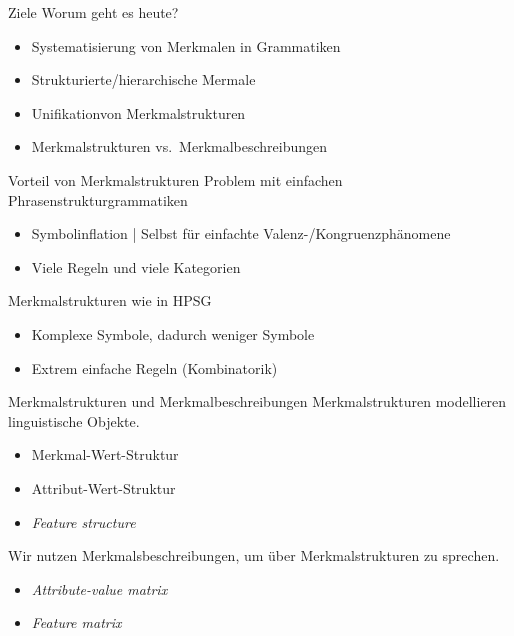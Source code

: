 
\begin{frame}
  {Ziele}
  \onslide<+->
  \onslide<+->
  Worum geht es heute?\\
  \Zeile
  \begin{itemize}[<+->]
    \item Systematisierung von Merkmalen in Grammatiken
    \item Strukturierte\slash hierarchische Mermale
    \item Unifikationvon Merkmalstrukturen
    \item Merkmalstrukturen vs.\ Merkmalbeschreibungen
  \end{itemize}
  \Zeile
  \centering
  \onslide<+->
\end{frame}


\begin{frame}
  {Vorteil von Merkmalstrukturen}
  \onslide<+->
  \onslide<+->
  Problem mit einfachen \alert{Phrasenstrukturgrammatiken}\\
  \Halbzeile
  \begin{itemize}[<+->]
    \item \alert{Symbolinflation} | Selbst für einfachte Valenz-\slash Kongruenzphänomene
    \item Viele Regeln und viele Kategorien
  \end{itemize}
  \onslide<+->
  \Zeile
  \alert{Merkmalstrukturen} wie in HPSG\\
  \Halbzeile
  \begin{itemize}[<+->]
    \item \alert{Komplexe Symbole}, dadurch weniger Symbole
    \item Extrem einfache \alert{Regeln} (Kombinatorik)
  \end{itemize}
\end{frame}

\begin{frame}
  {Merkmalstrukturen und Merkmalbeschreibungen}
  \onslide<+->
  \onslide<+->
  \alert{Merkmalstrukturen} modellieren linguistische Objekte.\\
  \Halbzeile
  \begin{itemize}[<+->]
    \item Merkmal-Wert-Struktur
    \item Attribut-Wert-Struktur
    \item \emph{Feature structure}
  \end{itemize}
  \onslide<+->
  \Zeile
  Wir nutzen \alert{Merkmalsbeschreibungen}, um über Merkmalstrukturen zu sprechen.\\
  \Halbzeile
  \begin{itemize}[<+->]
    \item \emph{Attribute-value matrix}
    \item \emph{Feature matrix}
  \end{itemize}
  \onslide<+->
  \Zeile
  \centering 
\end{frame}

